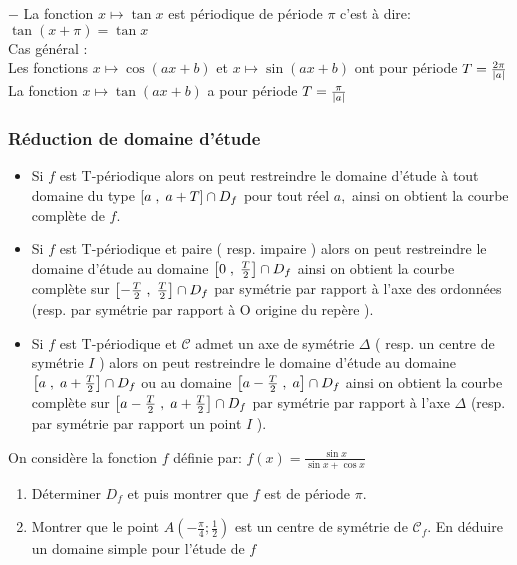 $ - $ La fonction $x\mapsto\tan x $ est périodique de période $ \pi $ c'est à dire:       \colorbox{green!20!} {$ \tan (x+\pi)=\tan x $}\\

\colorbox{magenta!20!}{Cas général }: \\
Les fonctions $x \mapsto \cos (ax+b) $ et $x \mapsto \sin (ax+b) $ ont pour période $ T=\frac{2\pi}{\left\lvert a \right\rvert}$ \\
La fonction $x \mapsto \tan (ax+b) $ a pour période $ T=\frac{\pi}{\left\lvert a \right\rvert}$ 

\subsubsection*{Réduction de domaine d'étude}

\begin{itemize}
\item[\textbullet] Si $ f $ est T-périodique alors on peut restreindre le domaine d'étude à tout domaine du type $ \left[a\;,\; a+T\right]\cap D_{f} $ pour tout réel $ a, $ ainsi on obtient la courbe complète de $ f. $
\item[\textbullet] Si $ f $ est T-périodique   et paire ( resp. impaire ) alors on peut restreindre le domaine d'étude au domaine  $ \left[0\;,\; \frac{T}{2}\right]\cap D_{f} $  ainsi on obtient la courbe complète sur $ \left[-\frac{T}{2}\;,\; \frac{T}{2}\right]\cap D_{f} $ par symétrie par rapport à l'axe des ordonnées (resp. par symétrie par rapport à O origine du repère ).
\item[\textbullet] Si $ f $ est T-périodique   et $ \mathcal{C} $  admet un axe de symétrie $ \Delta $ ( resp. un centre de symétrie $ I $ ) alors on peut restreindre le domaine d'étude au domaine \\ $ \left[a\;,\; a+\frac{T}{2}\right]\cap D_{f} $ ou au domaine  $ \left[a-\frac{T}{2}\;,\; a\right]\cap D_{f} $ ainsi on obtient la courbe complète sur $ \left[a-\frac{T}{2}\;,\; a+\frac{T}{2}\right]\cap D_{f} $ par symétrie par rapport à l'axe $ \Delta $  (resp. par symétrie par rapport un point $ I $ ).
\end{itemize}

 \begin{exercice}
On considère  la fonction $ f $ définie par: $ f(x)= \frac{\sin x }{\sin x+\cos x} $ 
\begin{enumerate}
\item Déterminer $ D_{f} $ et  puis montrer que  $ f$ est de période  $ \pi. $
\item Montrer que le point  $ A(-\frac{\pi}{4}; \frac{1}{2}) $ est un centre de symétrie de $ \mathcal{C}_{f} $. En déduire un domaine simple pour l'étude de $ f $ 
\end{enumerate}
 \end{exercice}

